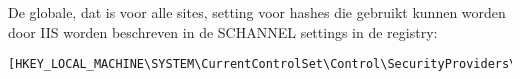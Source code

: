 De globale, dat is voor alle sites, setting voor hashes die gebruikt kunnen worden door IIS worden beschreven in de SCHANNEL settings in de registry:
\begin{lstlisting}
[HKEY_LOCAL_MACHINE\SYSTEM\CurrentControlSet\Control\SecurityProviders\Schannel\Hashes]
\end{lstlisting}
